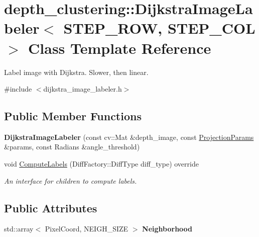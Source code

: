 \hypertarget{classdepth__clustering_1_1DijkstraImageLabeler}{}\section{depth\+\_\+clustering\+:\+:Dijkstra\+Image\+Labeler$<$ S\+T\+E\+P\+\_\+\+R\+OW, S\+T\+E\+P\+\_\+\+C\+OL $>$ Class Template Reference}
\label{classdepth__clustering_1_1DijkstraImageLabeler}


Label image with Dijkstra. Slower, then linear.  




{\ttfamily \#include $<$dijkstra\+\_\+image\+\_\+labeler.\+h$>$}

\subsection*{Public Member Functions}
\begin{DoxyCompactItemize}
\item 
\mbox{\label{classdepth__clustering_1_1DijkstraImageLabeler_ac852e1ee20615b3ba62b31a090157cdd}} 
{\bfseries Dijkstra\+Image\+Labeler} (const cv\+::\+Mat \&depth\+\_\+image, const \hyperlink{classdepth__clustering_1_1ProjectionParams}{Projection\+Params} \&params, const Radians \&angle\+\_\+threshold)
\item 
\mbox{\label{classdepth__clustering_1_1DijkstraImageLabeler_a949206a2cfbf234bb523c0a1bc0fc3ba}} 
void \hyperlink{classdepth__clustering_1_1DijkstraImageLabeler_a949206a2cfbf234bb523c0a1bc0fc3ba}{Compute\+Labels} (Diff\+Factory\+::\+Diff\+Type diff\+\_\+type) override
\begin{DoxyCompactList}\small\item\em An interface for children to compute labels. \end{DoxyCompactList}\end{DoxyCompactItemize}
\subsection*{Public Attributes}
\begin{DoxyCompactItemize}
\item 
\mbox{\label{classdepth__clustering_1_1DijkstraImageLabeler_ae7c58a8b42e1f17b76e3b48e610a1195}} 
std\+::array$<$ Pixel\+Coord, N\+E\+I\+G\+H\+\_\+\+S\+I\+ZE $>$ {\bfseries Neighborhood}
\end{DoxyCompactItemize}
